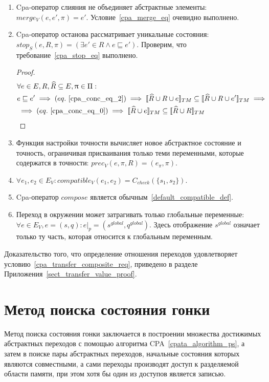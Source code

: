 \begin{enumerate}
\item Cpa-оператор слияния не объединяет абстрактные элементы: $merge_V(e, e', \pi) = e'$. Условие~\ref{cpa_merge_eq} очевидно выполнено.

\item Cpa-оператор останова рассматривает уникальные состояния: $stop_S(e, R, \pi) = (\exists e' \in R \land e \sqsubseteq e')$.
Проверим, что требование~\ref{cpa_stop_eq} выполнено.
\begin{proof}
\begin{align*}
&\forall e \in E, R, \widehat{R} \subseteq E, \pi \in \Pi: \\
& e \sqsubseteq e' \implies (eq.~\ref{cpa_conc_eq_2}) \implies \conctm{\widehat{R} \cup R \cup e} \subseteq \conctm{\widehat{R} \cup R \cup e'} \implies \\
& \implies (eq.~\ref{cpa_conc_eq_0}) \implies \conctm{\widehat{R} \cup e} \subseteq \conctm{\widehat{R} \cup R} 
\end{align*}
\end{proof}

\item Функция настройки точности вычисляет новое абстрактное состояние и точность, ограничивая присваивания только теми переменными, которые содержатся в точности: $prec_V(e, \pi, R) = (e_{\pi}, \pi)$.

\item $\forall e_1, e_2 \in E_V: compatible_V(e_1,e_2) = C_{check}(\{s_1, s_2\})$.

\item Cpa-оператор $compose$ является обычным~\ref{default_compatible_def}.

\item Переход в окружении может затрагивать только глобальные переменные: $\forall e \in E_V, e=(s,q):e|_p=(s^{global},q^{global})$.
 Здесь отображение $s^{global}$ означает только ту часть, которая относится к глобальным переменным.
\end{enumerate}

Доказательство того, что определение отношения переходов удовлетворяет условию~\ref{cpa_transfer_composite_req}, приведено в разделе Приложения~\ref{sect_transfer_value_proof}. 

\section{Метод поиска состояния гонки}
\label{sect_race_theory}

Метод поиска состояния гонки заключается в построении множества достижимых абстрактных переходов с помощью алгоритма CPA~\ref{cpata_algorithm_ps}, а затем в поиске пары абстрактных переходов, начальные состояния которых являются совместными, а сами переходы производят доступ к разделяемой области памяти, при этом хотя бы один из доступов является записью.

